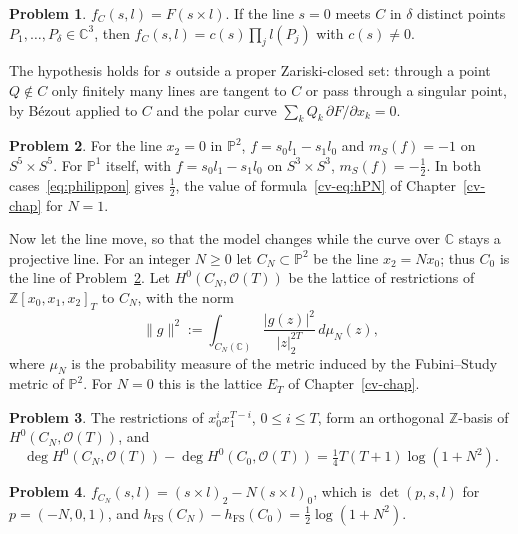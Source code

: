 \documentclass[reqno]{amsart}
\newcounter{chap}
\theoremstyle{definition}
\newtheorem{problem}{Problem}[section]
\theoremstyle{plain}
\newcommand{\Z}{\mathbb{Z}}
\newcommand{\C}{\mathbb{C}}
\newcommand{\Pb}{\mathbb{P}}
\newcommand{\mS}{m_{S}}
\newcommand{\hFS}{h_{\mathrm{FS}}}
\begin{document}
\begin{problem}\label{pr:chow-curve}
\(f_C(s, l) = F(s \times l)\).  If the line \(s = 0\) meets \(C\) in \(\delta\) distinct points \(P_1, \dots, P_\delta \in \C^3\), then \(f_C(s, l) = c(s)\prod_j l(P_j)\) with \(c(s) \ne 0\).
\end{problem}

The hypothesis holds for \(s\) outside a proper Zariski-closed set: through a point \(Q \notin C\) only finitely many lines are tangent to \(C\) or pass through a singular point, by B\'ezout applied to \(C\) and the polar curve \(\sum_k Q_k\,\partial F/\partial x_k = 0\).

\begin{problem}\label{pr:chow-line}
For the line \(x_2 = 0\) in \(\Pb^2\), \(f = s_0l_1 - s_1l_0\) and \(\mS(f) = -1\) on \(S^5 \times S^5\).  For \(\Pb^1\) itself, with \(f = s_0l_1 - s_1l_0\) on \(S^3 \times S^3\), \(\mS(f) = -\frac12\).  In both cases~\eqref{eq:philippon} gives \(\frac12\), the value of formula~\eqref{cv-eq:hPN} of Chapter~\ref{cv-chap} for \(N = 1\).
\end{problem}

Now let the line move, so that the model changes while the curve over \(\C\) stays a projective line.  For an integer \(N \ge 0\) let \(C_N \subset \Pb^2\) be the line \(x_2 = Nx_0\); thus \(C_0\) is the line of Problem~\ref{pr:chow-line}.  Let \(H^0(C_N, \mathcal O(T))\) be the lattice of restrictions of \(\Z[x_0, x_1, x_2]_T\) to \(C_N\), with the norm
\[
  \lVert g \rVert^2 := \int_{C_N(\C)} \frac{\lvert g(z) \rvert^2}{\lvert z \rvert_2^{2T}} \, d\mu_N(z) ,
\]
where \(\mu_N\) is the probability measure of the metric induced by the Fubini--Study metric of \(\Pb^2\).  For \(N = 0\) this is the lattice \(E_T\) of Chapter~\ref{cv-chap}.

\begin{problem}\label{pr:line-deg}
The restrictions of \(x_0^ix_1^{T-i}\), \(0 \le i \le T\), form an orthogonal \(\Z\)-basis of \(H^0(C_N, \mathcal O(T))\), and
\[
  \deg H^0(C_N, \mathcal O(T)) - \deg H^0(C_0, \mathcal O(T)) = \tfrac14 T(T+1)\log(1 + N^2) .
\]
\end{problem}

\begin{problem}\label{pr:line-chow}
\(f_{C_N}(s, l) = (s \times l)_2 - N(s \times l)_0\), which is \(\det(p, s, l)\) for \(p = (-N, 0, 1)\), and \(\hFS(C_N) - \hFS(C_0) = \frac12\log(1 + N^2)\).
\end{problem}
\end{document}
